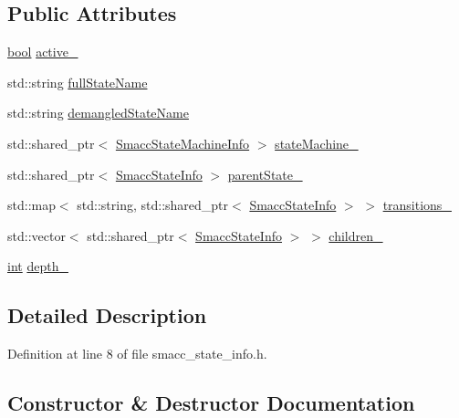 \subsection*{Public Attributes}
\begin{DoxyCompactItemize}
\item 
\hyperlink{classbool}{bool} \hyperlink{classsmacc_1_1SmaccStateInfo_a12b5db7f92c7d1bbef492b6f33d2680d}{active\+\_\+}
\item 
std\+::string \hyperlink{classsmacc_1_1SmaccStateInfo_a3d9d81ebeda351fba21665bb7b9ff148}{full\+State\+Name}
\item 
std\+::string \hyperlink{classsmacc_1_1SmaccStateInfo_ad36e29f3984e40d36664567f9703239a}{demangled\+State\+Name}
\item 
std\+::shared\+\_\+ptr$<$ \hyperlink{classsmacc_1_1SmaccStateMachineInfo}{Smacc\+State\+Machine\+Info} $>$ \hyperlink{classsmacc_1_1SmaccStateInfo_af9884b3fda41fbc87abf9908b8bd72e7}{state\+Machine\+\_\+}
\item 
std\+::shared\+\_\+ptr$<$ \hyperlink{classsmacc_1_1SmaccStateInfo}{Smacc\+State\+Info} $>$ \hyperlink{classsmacc_1_1SmaccStateInfo_ae19f4efbeb2ca665b320df80766d9209}{parent\+State\+\_\+}
\item 
std\+::map$<$ std\+::string, std\+::shared\+\_\+ptr$<$ \hyperlink{classsmacc_1_1SmaccStateInfo}{Smacc\+State\+Info} $>$ $>$ \hyperlink{classsmacc_1_1SmaccStateInfo_ad9a57f1532506ff82a2885e854f6132f}{transitions\+\_\+}
\item 
std\+::vector$<$ std\+::shared\+\_\+ptr$<$ \hyperlink{classsmacc_1_1SmaccStateInfo}{Smacc\+State\+Info} $>$ $>$ \hyperlink{classsmacc_1_1SmaccStateInfo_a7773f1d9e865a839b0bfed087bbb93ba}{children\+\_\+}
\item 
\hyperlink{classint}{int} \hyperlink{classsmacc_1_1SmaccStateInfo_a3f44d5af069d0f37ed63b3101b330a65}{depth\+\_\+}
\end{DoxyCompactItemize}


\subsection{Detailed Description}


Definition at line 8 of file smacc\+\_\+state\+\_\+info.\+h.



\subsection{Constructor \& Destructor Documentation}
